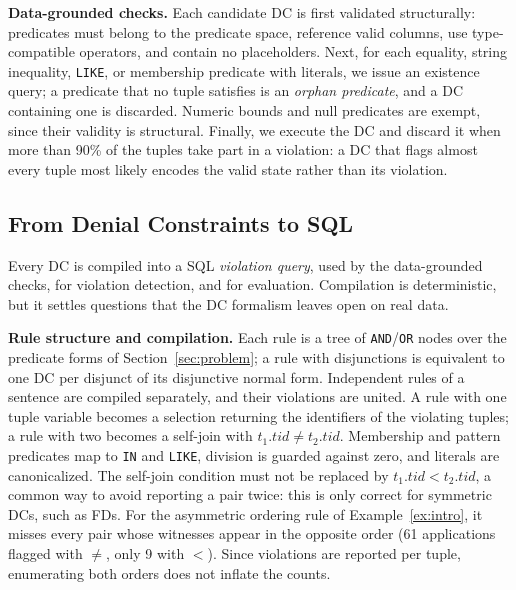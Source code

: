 \smallskip\noindent\textbf{Data-grounded checks.}
Each candidate DC is first validated structurally: predicates must belong to the predicate space, reference valid columns, use type-compatible operators, and contain no placeholders. Next, for each equality, string inequality, \texttt{LIKE}, or membership predicate with literals, we issue an existence query; a predicate that no tuple satisfies is an \emph{orphan predicate}, and a DC containing one is discarded. Numeric bounds and null predicates are exempt, since their validity is structural. Finally, we execute the DC and discard it when more than 90\% of the tuples take part in a violation: a DC that flags almost every tuple most likely encodes the valid state rather than its violation.

\subsection{From Denial Constraints to SQL}
\label{sec:mapper:sql}

Every DC is compiled into a SQL \emph{violation query}, used by the data-grounded checks, for violation detection, and for evaluation. Compilation is deterministic, but it settles questions that the DC formalism leaves open on real data.

\smallskip\noindent\textbf{Rule structure and compilation.}
Each rule is a tree of \texttt{AND}/\texttt{OR} nodes over the predicate forms of Section~\ref{sec:problem}; a rule with disjunctions is equivalent to one DC per disjunct of its disjunctive normal form. Independent rules of a sentence are compiled separately, and their violations are united. A rule with one tuple variable becomes a selection returning the identifiers of the violating tuples; a rule with two becomes a self-join with $t_1.\mathit{tid} \neq t_2.\mathit{tid}$. Membership and pattern predicates map to \texttt{IN} and \texttt{LIKE}, division is guarded against zero, and literals are canonicalized. The self-join condition must not be replaced by $t_1.\mathit{tid} < t_2.\mathit{tid}$, a common way to avoid reporting a pair twice: this is only correct for symmetric DCs, such as FDs. For the asymmetric ordering rule of Example~\ref{ex:intro}, it misses every pair whose witnesses appear in the opposite order (61 applications flagged with $\neq$, only 9 with $<$). Since violations are reported per tuple, enumerating both orders does not inflate the counts.

